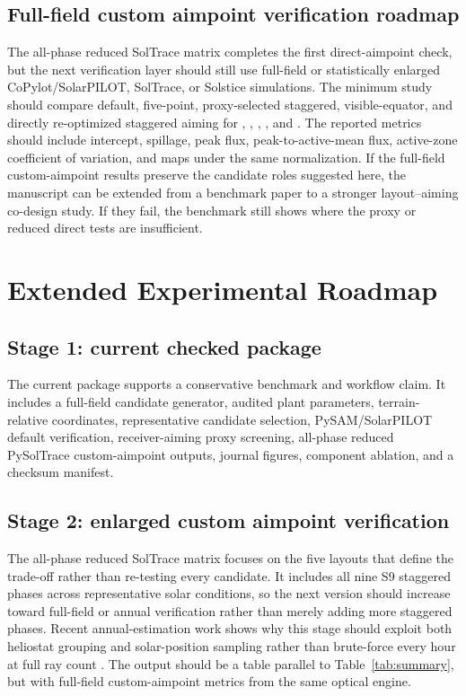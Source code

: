 \documentclass[final,3p,times]{elsarticle}
\begin{document}
\subsection{Full-field custom aimpoint verification roadmap}
The all-phase reduced SolTrace matrix completes the first direct-aimpoint check, but the next verification layer should still use full-field or statistically enlarged CoPylot/SolarPILOT, SolTrace, or Solstice simulations. The minimum study should compare default, five-point, proxy-selected staggered, visible-equator, and directly re-optimized staggered aiming for , , , , and . The reported metrics should include intercept, spillage, peak flux, peak-to-active-mean flux, active-zone coefficient of variation, and maps under the same normalization. If the full-field custom-aimpoint results preserve the candidate roles suggested here, the manuscript can be extended from a benchmark paper to a stronger layout--aiming co-design study. If they fail, the benchmark still shows where the proxy or reduced direct tests are insufficient.

\section{Extended Experimental Roadmap}
\subsection{Stage 1: current checked package}
The current package supports a conservative benchmark and workflow claim. It includes a full-field candidate generator, audited plant parameters, terrain-relative coordinates, representative candidate selection, PySAM/SolarPILOT default verification, receiver-aiming proxy screening, all-phase reduced PySolTrace custom-aimpoint outputs, journal figures, component ablation, and a checksum manifest.

\subsection{Stage 2: enlarged custom aimpoint verification}
The all-phase reduced SolTrace matrix focuses on the five layouts that define the trade-off rather than re-testing every candidate. It includes all nine S9 staggered phases across representative solar conditions, so the next version should increase toward full-field or annual verification rather than merely adding more staggered phases. Recent annual-estimation work shows why this stage should exploit both heliostat grouping and solar-position sampling rather than brute-force every hour at full ray count \cite{liu2026fastannual}. The output should be a table parallel to Table~\ref{tab:summary}, but with full-field custom-aimpoint metrics from the same optical engine.
\end{document}
